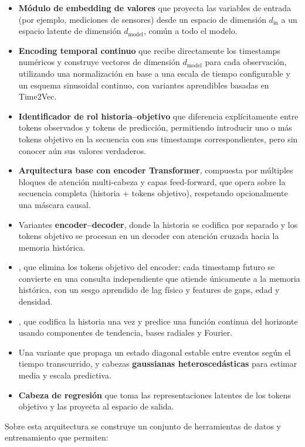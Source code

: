 \begin{itemize}
    \item \textbf{Módulo de embedding de valores} que proyecta las variables de entrada (por ejemplo, mediciones de sensores) desde un espacio de dimensión $d_{\text{in}}$ a un espacio latente de dimensión $d_{\text{model}}$, común a todo el modelo.
    \item \textbf{Encoding temporal continuo} que recibe directamente los timestamps numéricos y construye vectores de dimensión $d_{\text{model}}$ para cada observación, utilizando una normalización en base a una escala de tiempo configurable y un esquema sinusoidal continuo, con variantes aprendibles basadas en Time2Vec.
    \item \textbf{Identificador de rol historia--objetivo} que diferencia explícitamente entre tokens observados y tokens de predicción, permitiendo introducir uno o más tokens objetivo en la secuencia con sus timestamps correspondientes, pero sin conocer aún sus valores verdaderos.
    \item \textbf{Arquitectura base con encoder Transformer}, compuesta por múltiples bloques de atención multi-cabeza y capas feed-forward, que opera sobre la secuencia completa (historia + tokens objetivo), respetando opcionalmente una máscara causal.
    \item Variantes \textbf{encoder--decoder}, donde la historia se codifica por separado y los tokens objetivo se procesan en un decoder con atención cruzada hacia la memoria histórica.
    \item \textbf{\QueryCross}, que elimina los tokens objetivo del encoder: cada timestamp futuro se convierte en una consulta independiente que atiende únicamente a la memoria histórica, con un sesgo aprendido de lag físico y features de gaps, edad y densidad.
    \item \textbf{\ContinuousBasis}, que codifica la historia una vez y predice una función continua del horizonte usando componentes de tendencia, bases radiales y Fourier.
    \item Una variante \textbf{\CTSSM} que propaga un estado diagonal estable entre eventos según el tiempo transcurrido, y cabezas \textbf{gaussianas heteroscedásticas} para estimar media y escala predictiva.
    \item \textbf{Cabeza de regresión} que toma las representaciones latentes de los tokens objetivo y las proyecta al espacio de salida.
\end{itemize}

Sobre esta arquitectura se construye un conjunto de herramientas de datos y entrenamiento que permiten:

